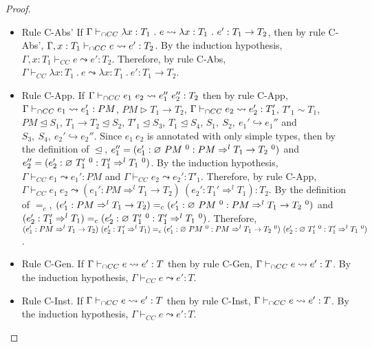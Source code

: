 \documentclass[a4paper]{article}
\begin{document}
\begin{proof}
\begin{itemize}
    \item Rule C-Abs'
    If $\Gamma \vdash_{\cap CC} \lambda x : T_1\ .\ e \leadsto \lambda x : T_1\ .\ e' : T_1 \rightarrow T_2$, then by rule C-Abs', $\Gamma, x : T_1 \vdash_{\cap CC} e \leadsto e' : T_2$.
    By the induction hypothesis, $\Gamma, x : T_1 \vdash_{CC} e \leadsto e' : T_2$.
    Therefore, by rule C-Abs, $\Gamma \vdash_{CC} \lambda x : T_1\ .\ e \leadsto \lambda x : T_1\ .\ e' : T_1 \rightarrow T_2$.
    \item Rule C-App.
    If $\Gamma \vdash_{\cap CC} e_1\ e_2 \leadsto e_1''\ e_2'' : T_2$ then by rule C-App, $\Gamma \vdash_{\cap CC} e_1 \leadsto e_1' : PM$, $PM \rhd T_1 \rightarrow T_2$, $\Gamma \vdash_{\cap CC} e_2 \leadsto e_2' : T'_1$, $T'_1 \sim T_1$, $PM \trianglelefteq S_1$, $T_1 \rightarrow T_2 \trianglelefteq S_2$, $T'_1 \trianglelefteq S_3$, $T_1 \trianglelefteq S_4$, $S_1,\ S_2,\ e_1' \hookrightarrow e_1''$ and $S_3,\ S_4,\ e_2' \hookrightarrow e_2''$.
    Since $e_1\ e_2$ is annotated with only simple types, then by the definition of $\trianglelefteq$, $e_1'' = (e_1' : \varnothing\ PM\ ^{0} : PM \Rightarrow^l T_1 \rightarrow T_2\ ^0)$ and $e_2'' = (e_2' : \varnothing\ T_1'\ ^{0} : T_1' \Rightarrow^l T_1\ ^0)$.
    By the induction hypothesis, $\Gamma \vdash_{CC} e_1 \leadsto e_1' : PM$ and $\Gamma \vdash_{CC} e_2 \leadsto e_2' : T'_1$.
    Therefore, by rule C-App, $\Gamma \vdash_{CC} e_1\ e_2 \leadsto (e_1' : PM \Rightarrow^l T_1 \rightarrow T_2)\ (e_2' : T_1' \Rightarrow^l T_1) : T_2$.
    By the definition of $=_c$, $(e_1' : PM \Rightarrow^l T_1 \rightarrow T_2) =_c (e_1' : \emptycast{PM}{0} : PM \Rightarrow^l T_1 \rightarrow T_2\ ^0)$ and $(e_2' : T_1' \Rightarrow^l T_1) =_c (e_2' : \emptycast{T_1'}{0} : T_1' \Rightarrow^l T_1\ ^0)$.
    Therefore, $(e_1' : PM \Rightarrow^l T_1 \rightarrow T_2)\ (e_2' : T_1' \Rightarrow^l T_1) =_c (e_1' : \emptycast{PM}{0} : PM \Rightarrow^l T_1 \rightarrow T_2\ ^0)\ (e_2' : \emptycast{T_1'}{0} : T_1' \Rightarrow^l T_1\ ^0)$.
    \item Rule C-Gen.
    If $\Gamma \vdash_{\cap CC} e \leadsto e' : T$ then by rule C-Gen, $\Gamma \vdash_{\cap CC} e \leadsto e' : T$.
    By the induction hypothesis, $\Gamma \vdash_{CC} e \leadsto e' : T$.
    \item Rule C-Inst.
    If $\Gamma \vdash_{\cap CC} e \leadsto e' : T$ then by rule C-Inst, $\Gamma \vdash_{\cap CC} e \leadsto e' : T$.
    By the induction hypothesis, $\Gamma \vdash_{CC} e \leadsto e' : T$.
\end{itemize}
\end{proof}
\end{document}
